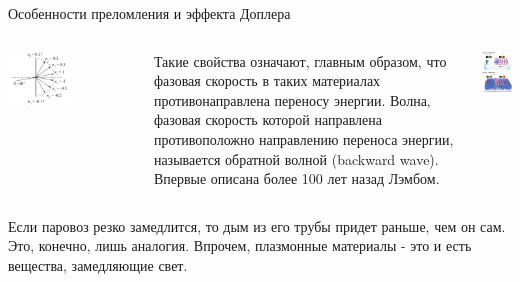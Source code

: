 \documentclass[9pt, compress, xcolor=table]{beamer}
\begin{document}
\begin{frame}{Особенности преломления и эффекта Доплера}


\begin{columns}[c]
\column{6cm}
\begin{center}
\includegraphics[width=0.5\textwidth]{neg_ref_2}
\end{center}
Такие свойства означают, главным образом, что фазовая скорость в таких материалах противонаправлена переносу энергии. Волна, фазовая скорость которой направлена противоположно направлению переноса энергии, называется \textcolor{red!50!black}{обратной волной (backward wave)}. Впервые описана более 100 лет назад Лэмбом.
\column{6cm}
\begin{center}
\includegraphics[width=5cm]{neg_ref_6}
\end{center}
\end{columns}
Если паровоз резко замедлится, то дым из его трубы придет раньше, чем он сам. Это, конечно, лишь аналогия. Впрочем, плазмонные материалы - это и есть вещества, замедляющие свет.

\end{frame}
\end{document}

